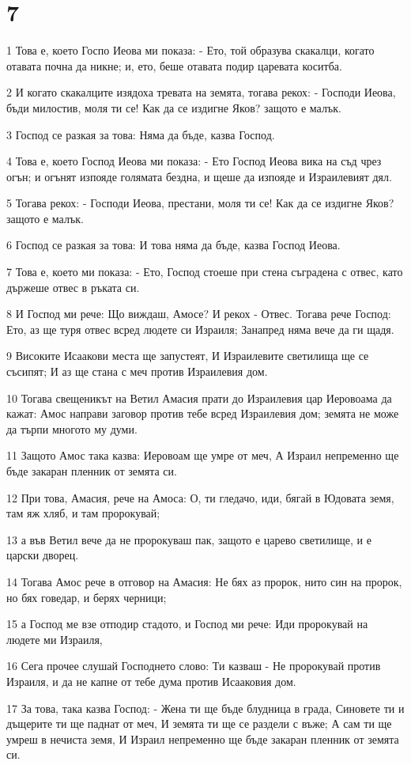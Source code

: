 \chapter{7}

\par 1 Това е, което Госпо Иеова ми показа: - Ето, той образува скакалци, когато отавата почна да никне; и, ето, беше отавата подир царевата коситба.
\par 2 И когато скакалците изядоха тревата на земята, тогава рекох: - Господи Иеова, бъди милостив, моля ти се! Как да се издигне Яков? защото е малък.
\par 3 Господ се разкая за това: Няма да бъде, казва Господ.
\par 4 Това е, което Господ Иеова ми показа: - Ето Господ Иеова вика на съд чрез огън; и огънят изпояде голямата бездна, и щеше да изпояде и Израилевият дял.
\par 5 Тогава рекох: - Господи Иеова, престани, моля ти се! Как да се издигне Яков? защото е малък.
\par 6 Господ се разкая за това: И това няма да бъде, казва Господ Иеова.
\par 7 Това е, което ми показа: - Ето, Господ стоеше при стена съградена с отвес, като държеше отвес в ръката си.
\par 8 И Господ ми рече: Що виждаш, Амосе? И рекох - Отвес. Тогава рече Господ: Ето, аз ще туря отвес всред людете си Израиля; Занапред няма вече да ги щадя.
\par 9 Високите Исаакови места ще запустеят, И Израилевите светилища ще се съсипят; И аз ще стана с меч против Израилевия дом.
\par 10 Тогава свещеникът на Ветил Амасия прати до Израилевия цар Иеровоама да кажат: Амос направи заговор против тебе всред Израилевия дом; земята не може да търпи многото му думи.
\par 11 Защото Амос така казва: Иеровоам ще умре от меч, А Израил непременно ще бъде закаран пленник от земята си.
\par 12 При това, Амасия, рече на Амоса: О, ти гледачо, иди, бягай в Юдовата земя, там яж хляб, и там пророкувай;
\par 13 а във Ветил вече да не пророкуваш пак, защото е царево светилище, и е царски дворец.
\par 14 Тогава Амос рече в отговор на Амасия: Не бях аз пророк, нито син на пророк, но бях говедар, и берях черници;
\par 15 а Господ ме взе отподир стадото, и Господ ми рече: Иди пророкувай на людете ми Израиля,
\par 16 Сега прочее слушай Господнето слово: Ти казваш - Не пророкувай против Израиля, и да не капне от тебе дума против Исааковия дом.
\par 17 За това, така казва Господ: - Жена ти ще бъде блудница в града, Синовете ти и дъщерите ти ще паднат от меч, И земята ти ще се раздели с въже; А сам ти ще умреш в нечиста земя, И Израил непременно ще бъде закаран пленник от земята си.

